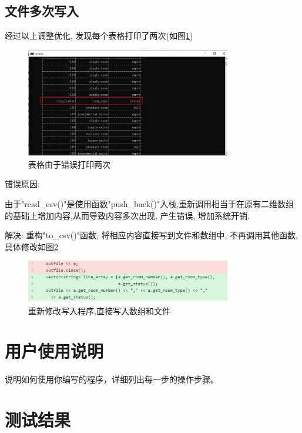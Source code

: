 \documentclass[UTF8]{ctexart}
\begin{document}
  \subsection{文件多次写入}
    经过以上调整优化, 发现每个表格打印了两次(如图\ref{fig:bug_3})
    \begin{figure}[H]
      \centering
      \includegraphics[width=0.8\textwidth]{bug_3}
      \caption{表格由于错误打印两次}
      \label{fig:bug_3}
    \end{figure}

  错误原因:

  由于"read\_csv()"是使用函数"push\_back()"入栈,重新调用相当于在原有二维数组的基础上增加内容,从而导致内容多次出现, 产生错误, 增加系统开销.

  解决:
  重构"to\_csv()"函数, 将相应内容直接写到文件和数组中, 不再调用其他函数,具体修改如图\ref{fig:bug_3_fix}

  \begin{figure}[H]
      \centering
      \includegraphics[width=0.8\textwidth]{bug_3_fix}
      \caption{重新修改写入程序,直接写入数组和文件}
      \label{fig:bug_3_fix}
    \end{figure}

\section{用户使用说明}
  说明如何使用你编写的程序，详细列出每一步的操作步骤。
\section{测试结果}
\end{document}
